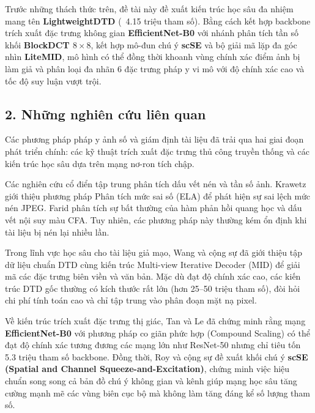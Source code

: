 Trước những thách thức trên, đề tài này đề xuất kiến trúc học sâu đa nhiệm mang tên \textbf{LightweightDTD} (~4.15 triệu tham số). Bằng cách kết hợp backbone trích xuất đặc trưng không gian \textbf{EfficientNet-B0} với nhánh phân tích tần số khối \textbf{BlockDCT $8 \times 8$}, kết hợp mô-đun chú ý \textbf{scSE} và bộ giải mã lặp đa góc nhìn \textbf{LiteMID}, mô hình có thể đồng thời khoanh vùng chính xác điểm ảnh bị làm giả và phân loại đa nhãn 6 đặc trưng pháp y vi mô với độ chính xác cao và tốc độ suy luận vượt trội.

\subsection{2. Những nghiên cứu liên quan}

\indent\indent Các phương pháp pháp y ảnh số và giám định tài liệu đã trải qua hai giai đoạn phát triển chính: các kỹ thuật trích xuất đặc trưng thủ công truyền thống và các kiến trúc học sâu dựa trên mạng nơ-ron tích chập.

Các nghiên cứu cổ điển tập trung phân tích dấu vết nén và tần số ảnh. Krawetz \cite{krawetz2007picture} giới thiệu phương pháp Phân tích mức sai số (ELA) để phát hiện sự sai lệch mức nén JPEG. Farid \cite{farid2009image} phân tích sự bất thường của hàm phản hồi quang học và dấu vết nội suy màu CFA. Tuy nhiên, các phương pháp này thường kém ổn định khi tài liệu bị nén lại nhiều lần.\vspace{0.3cm}

Trong lĩnh vực học sâu cho tài liệu giả mạo, Wang và cộng sự \cite{dtd_dataset} đã giới thiệu tập dữ liệu chuẩn DTD cùng kiến trúc Multi-view Iterative Decoder (MID) để giải mã các đặc trưng biên viền và văn bản. Mặc dù đạt độ chính xác cao, các kiến trúc DTD gốc thường có kích thước rất lớn (hơn 25--50 triệu tham số), đòi hỏi chi phí tính toán cao và chỉ tập trung vào phân đoạn mặt nạ pixel.\vspace{0.3cm}

Về kiến trúc trích xuất đặc trưng thị giác, Tan và Le \cite{tan2019efficientnet} đã chứng minh rằng mạng \textbf{EfficientNet-B0} với phương pháp co giãn phức hợp (Compound Scaling) có thể đạt độ chính xác tương đương các mạng lớn như ResNet-50 \cite{he2015deepresiduallearningimage} nhưng chỉ tiêu tốn 5.3 triệu tham số backbone. Đồng thời, Roy và cộng sự \cite{roy2018concurrent} đề xuất khối chú ý \textbf{scSE (Spatial and Channel Squeeze-and-Excitation)}, chứng minh việc hiệu chuẩn song song cả bản đồ chú ý không gian và kênh giúp mạng học sâu tăng cường mạnh mẽ các vùng biên cục bộ mà không làm tăng đáng kể số lượng tham số.\vspace{0.3cm}

